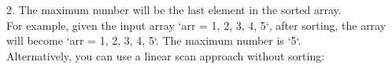 \documentclass[preview]{standalone}
\begin{document}
2. The maximum number will be the last element in the sorted array.\\For example, given the input array `arr = 1, 2, 3, 4, 5`, after sorting, the array will become `arr = 1, 2, 3, 4, 5`. The maximum number is `5`.\\Alternatively, you can use a linear scan approach without sorting:\\
\end{document}
